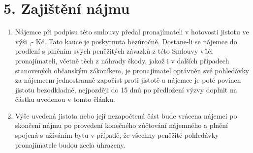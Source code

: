 \section*{5. Zajištění nájmu}

\begin{enumerate}[label=\arabic*.]
    \item Nájemce při podpisu této smlouvy předal pronajímateli v hotovosti jistotu ve výši \DepositAmount,- Kč. Tato kauce je poskytnuta bezúročně. Dostane-li se nájemce do prodlení s plněním svých peněžitých závazků z této Smlouvy vůči pronajímateli, včetně těch z náhrady škody, jakož i v dalších případech stanovených občanským zákoníkem, je pronajímatel oprávněn své pohledávky za nájemcem jednostranně započíst proti jistotě a nájemce je poté povinen jistotu bezodkladně, nejpozději do 15 dnů po předložení výzvy doplnit na částku uvedenou v tomto článku.
    \item Výše uvedená jistota nebo její nezapočtená část bude vrácena nájemci po skončení nájmu po provedení konečného zúčtování nájemného a plnění spojená s užíváním bytu v případě, že všechny peněžité pohledávky pronajímatele budou zcela uhrazeny.
\end{enumerate}
